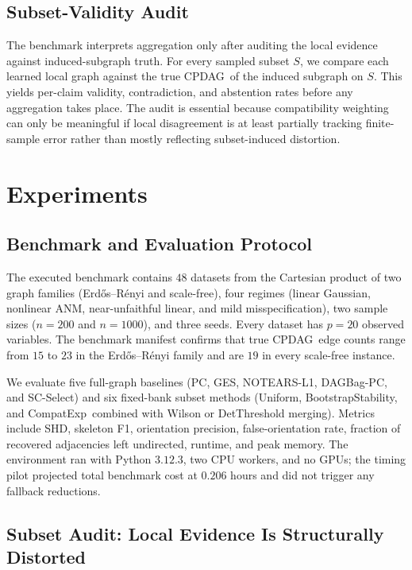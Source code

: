\documentclass{article}
\newcommand{\method}{CompatExp}
\newcommand{\cpdag}{CPDAG}
\newcommand{\forate}{false-orientation rate}
\begin{document}
\subsection{Subset-Validity Audit}

The benchmark interprets aggregation only after auditing the local evidence against induced-subgraph truth. For every sampled subset $S$, we compare each learned local graph against the true \cpdag\ of the induced subgraph on $S$. This yields per-claim validity, contradiction, and abstention rates before any aggregation takes place. The audit is essential because compatibility weighting can only be meaningful if local disagreement is at least partially tracking finite-sample error rather than mostly reflecting subset-induced distortion.

\section{Experiments}
\label{sec:experiments}

\subsection{Benchmark and Evaluation Protocol}

The executed benchmark contains $48$ datasets from the Cartesian product of two graph families (Erd\H{o}s--R\'enyi and scale-free), four regimes (linear Gaussian, nonlinear ANM, near-unfaithful linear, and mild misspecification), two sample sizes ($n=200$ and $n=1000$), and three seeds. Every dataset has $p=20$ observed variables. The benchmark manifest confirms that true \cpdag\ edge counts range from $15$ to $23$ in the Erd\H{o}s--R\'enyi family and are $19$ in every scale-free instance.

We evaluate five full-graph baselines (PC, GES, NOTEARS-L1, DAGBag-PC, and SC-Select) and six fixed-bank subset methods (Uniform, BootstrapStability, and \method\ combined with Wilson or DetThreshold merging). Metrics include SHD, skeleton F1, orientation precision, \forate, fraction of recovered adjacencies left undirected, runtime, and peak memory. The environment ran with Python $3.12.3$, two CPU workers, and no GPUs; the timing pilot projected total benchmark cost at $0.206$ hours and did not trigger any fallback reductions.

\subsection{Subset Audit: Local Evidence Is Structurally Distorted}
\end{document}
